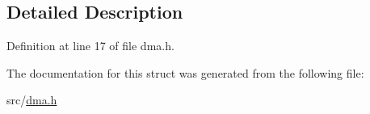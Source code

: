 \subsection{Detailed Description}


Definition at line 17 of file dma.\+h.



The documentation for this struct was generated from the following file\+:\begin{DoxyCompactItemize}
\item 
src/\hyperlink{dma_8h}{dma.\+h}\end{DoxyCompactItemize}

